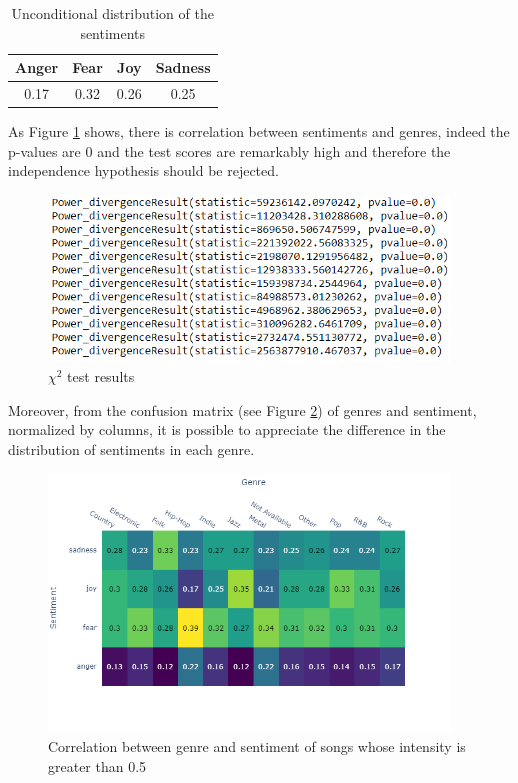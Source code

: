 \documentclass[runningheads]{llncs}
\begin{document}
\begin{table}[H]
    \centering
    \begin{tabular}{|c |c |c|c|} 
     \hline
     Anger & Fear & Joy  & Sadness\\ [0.5ex] 
     \hline
     0.17 & 0.32 & 0.26  & 0.25 \\ 
     \hline
    \end{tabular}
     \caption{Unconditional distribution of the sentiments}
    \label{tab:sentimentdistribution}
\end{table}



As Figure \ref{fig:chi_square} shows, there is correlation between sentiments and genres, indeed the p-values are 0 and the test scores are remarkably high and therefore the independence hypothesis should be rejected.
\begin{figure}[H]
    \centering
    \includegraphics[width=0.95\textwidth]{images/chi_squared.PNG}
    \caption{$\chi^2$ test results}
    \label{fig:chi_square}
\end{figure}
Moreover, from the confusion matrix (see Figure \ref{fig:correlations}) of genres and sentiment, normalized by columns, it is possible to appreciate the difference in the distribution of sentiments in each genre.
\begin{figure}[H]
    \centering
    \includegraphics[width=0.95\textwidth]{images/correlation.png}
    \caption{Correlation between genre and sentiment of songs whose intensity is greater than 0.5}
    \label{fig:correlations}
\end{figure}
\end{document}
